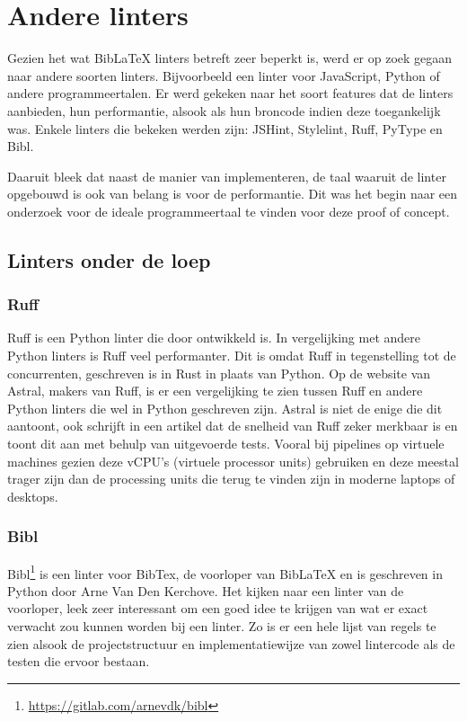 \section{Andere linters}
Gezien het wat BibLaTeX linters betreft zeer beperkt is, werd er op zoek gegaan naar andere soorten linters. Bijvoorbeeld een linter voor JavaScript, Python of andere programmeertalen. Er werd gekeken naar het soort features dat de linters aanbieden, hun performantie, alsook als hun broncode indien deze toegankelijk was. Enkele linters die bekeken werden zijn: JSHint, Stylelint, Ruff, PyType en Bibl.

Daaruit bleek dat naast de manier van implementeren, de taal waaruit de linter opgebouwd is ook van belang is voor de performantie. Dit was het begin naar een onderzoek voor de ideale programmeertaal te vinden voor deze proof of concept. 

\subsection{Linters onder de loep}
\subsubsection{Ruff}
Ruff is een Python linter die door \textcite{Astral2024} ontwikkeld is. In vergelijking met andere Python linters is Ruff veel performanter. Dit is omdat Ruff in tegenstelling tot de concurrenten, geschreven is in Rust in plaats van Python. Op de website van Astral, makers van Ruff, is er een vergelijking te zien tussen Ruff en andere Python linters die wel in Python geschreven zijn. Astral is niet de enige die dit aantoont, ook \textcite{TurnerTrauring2023} schrijft in een artikel dat de snelheid van Ruff zeker merkbaar is en toont dit aan met behulp van uitgevoerde tests. Vooral bij pipelines op virtuele machines gezien deze vCPU's (virtuele processor units) gebruiken en deze meestal trager zijn dan de processing units die terug te vinden zijn in moderne laptops of desktops.

\subsubsection{Bibl}
Bibl\footnote{\url{https://gitlab.com/arnevdk/bibl}} is een linter voor BibTex, de voorloper van BibLaTeX en is geschreven in Python door Arne Van Den Kerchove. Het kijken naar een linter van de voorloper, leek zeer interessant om een goed idee te krijgen van wat er exact verwacht zou kunnen worden bij een linter. Zo is er een hele lijst van regels te zien alsook de projectstructuur en implementatiewijze van zowel lintercode als de testen die ervoor bestaan.

